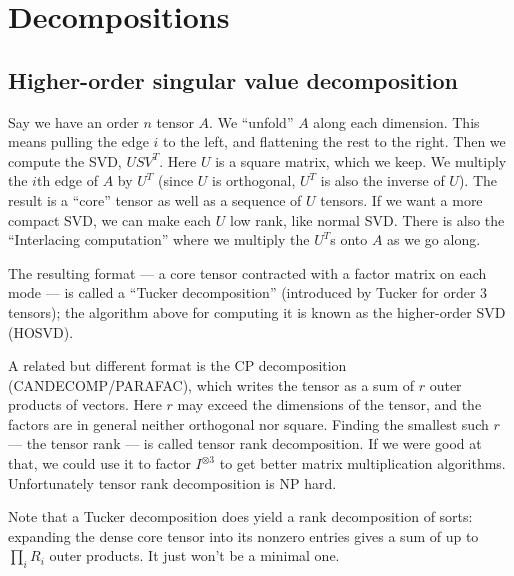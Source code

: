 
\chapter{Decompositions}


\section{Higher-order singular value decomposition}
\label{sec:HOSVD}
Say we have an order $n$ tensor $A$.
We ``unfold'' $A$ along each dimension.
This means pulling the edge $i$ to the left, and flattening the rest to the right.
Then we compute the SVD, $USV^T$.
Here $U$ is a square matrix, which we keep.
We multiply the $i$th edge of $A$ by $U^T$ (since $U$ is orthogonal, $U^T$ is also the inverse of $U$).
The result is a ``core'' tensor as well as a sequence of $U$ tensors.
If we want a more compact SVD, we can make each $U$ low rank, like normal SVD.
There is also the ``Interlacing computation'' where we multiply the $U^T$s onto $A$ as we go along.

The resulting format --- a core tensor contracted with a factor matrix on each mode --- is called a ``Tucker decomposition'' (introduced by Tucker for order $3$ tensors); the algorithm above for computing it is known as the higher-order SVD (HOSVD).

A related but different format is the CP decomposition (CANDECOMP/PARAFAC), which writes the tensor as a sum of $r$ outer products of vectors.
Here $r$ may exceed the dimensions of the tensor, and the factors are in general neither orthogonal nor square.
Finding the smallest such $r$ --- the tensor rank --- is called tensor rank decomposition.
If we were good at that, we could use it to factor $I^{\otimes 3}$ to get better matrix multiplication algorithms.
Unfortunately tensor rank decomposition is NP hard.

Note that a Tucker decomposition does yield a rank decomposition of sorts: expanding the dense core tensor into its nonzero entries gives a sum of up to $\prod_i R_i$ outer products.
It just won't be a minimal one.

